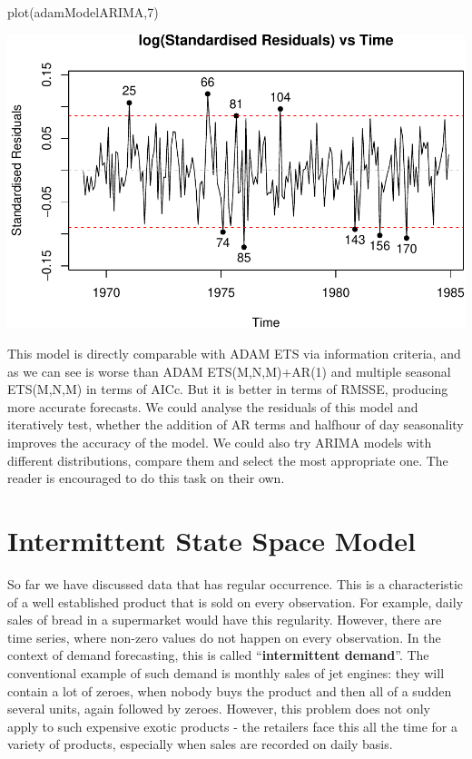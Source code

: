 \documentclass[
]{book}
\newenvironment{Shaded}{\begin{snugshade}}{\end{snugshade}}
\newcommand{\DecValTok}[1]{\textcolor[rgb]{0.00,0.00,0.81}{#1}}
\newcommand{\FunctionTok}[1]{\textcolor[rgb]{0.00,0.00,0.00}{#1}}
\newcommand{\NormalTok}[1]{#1}
\theoremstyle{definition}
\theoremstyle{definition}
\theoremstyle{definition}
\theoremstyle{definition}
\theoremstyle{remark}
\begin{document}
\begin{Shaded}
\begin{Highlighting}[]
\FunctionTok{plot}\NormalTok{(adamModelARIMA,}\DecValTok{7}\NormalTok{)}
\end{Highlighting}
\end{Shaded}

\includegraphics{adam_files/figure-latex/unnamed-chunk-111-1.pdf}

This model is directly comparable with ADAM ETS via information criteria, and as we can see is worse than ADAM ETS(M,N,M)+AR(1) and multiple seasonal ETS(M,N,M) in terms of AICc. But it is better in terms of RMSSE, producing more accurate forecasts. We could analyse the residuals of this model and iteratively test, whether the addition of AR terms and halfhour of day seasonality improves the accuracy of the model. We could also try ARIMA models with different distributions, compare them and select the most appropriate one. The reader is encouraged to do this task on their own.

\hypertarget{ADAMIntermittent}{%
\chapter{Intermittent State Space Model}\label{ADAMIntermittent}}

So far we have discussed data that has regular occurrence. This is a characteristic of a well established product that is sold on every observation. For example, daily sales of bread in a supermarket would have this regularity. However, there are time series, where non-zero values do not happen on every observation. In the context of demand forecasting, this is called ``\textbf{intermittent demand}''. The conventional example of such demand is monthly sales of jet engines: they will contain a lot of zeroes, when nobody buys the product and then all of a sudden several units, again followed by zeroes. However, this problem does not only apply to such expensive exotic products - the retailers face this all the time for a variety of products, especially when sales are recorded on daily basis.
\end{document}
